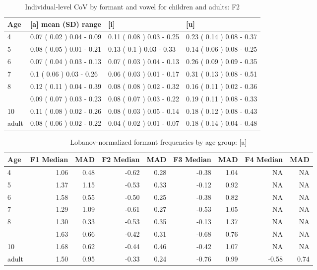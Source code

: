 \documentclass[
]{article}
\begin{document}
\begin{table}[!h]

\caption{\label{tab:delta-disp-tbl-spkr-alldata-f2}Individual-level CoV by formant and vowel for children and adults: F2}
\centering
\begin{tabular}[t]{llll}
\toprule
Age & [a] mean (SD) range & [i] & [u]\\
\midrule
4 & 0.07 ( 0.02 ) 0.04 - 0.09 & 0.11 ( 0.08 ) 0.03 - 0.25 & 0.23 ( 0.14 ) 0.08 - 0.37\\
5 & 0.08 ( 0.05 ) 0.01 - 0.21 & 0.13 ( 0.1 ) 0.03 - 0.33 & 0.14 ( 0.06 ) 0.08 - 0.25\\
6 & 0.07 ( 0.04 ) 0.03 - 0.13 & 0.07 ( 0.03 ) 0.04 - 0.13 & 0.26 ( 0.09 ) 0.09 - 0.35\\
7 & 0.1 ( 0.06 ) 0.03 - 0.26 & 0.06 ( 0.03 ) 0.01 - 0.17 & 0.31 ( 0.13 ) 0.08 - 0.51\\
8 & 0.12 ( 0.11 ) 0.04 - 0.39 & 0.08 ( 0.08 ) 0.02 - 0.32 & 0.16 ( 0.11 ) 0.02 - 0.36\\
\addlinespace
9 & 0.09 ( 0.07 ) 0.03 - 0.23 & 0.08 ( 0.07 ) 0.03 - 0.22 & 0.19 ( 0.11 ) 0.08 - 0.33\\
10 & 0.11 ( 0.08 ) 0.02 - 0.26 & 0.08 ( 0.03 ) 0.05 - 0.14 & 0.18 ( 0.12 ) 0.08 - 0.43\\
adult & 0.08 ( 0.06 ) 0.02 - 0.22 & 0.04 ( 0.02 ) 0.01 - 0.07 & 0.18 ( 0.14 ) 0.04 - 0.48\\
\bottomrule
\end{tabular}
\end{table}

\begin{table}[!h]

\caption{\label{tab:lobanov-meas-tbl-a}Lobanov-normalized formant frequencies by age group: [a]}
\centering
\begin{tabular}[t]{lrrrrrrrr}
\toprule
Age & F1 Median & MAD & F2 Median & MAD & F3 Median & MAD & F4 Median & MAD\\
\midrule
4 & 1.06 & 0.48 & -0.62 & 0.28 & -0.38 & 1.04 & NA & NA\\
5 & 1.37 & 1.15 & -0.53 & 0.33 & -0.12 & 0.92 & NA & NA\\
6 & 1.58 & 0.55 & -0.50 & 0.25 & -0.38 & 0.82 & NA & NA\\
7 & 1.29 & 1.09 & -0.61 & 0.27 & -0.53 & 1.05 & NA & NA\\
8 & 1.30 & 0.33 & -0.53 & 0.35 & -0.13 & 1.37 & NA & NA\\
\addlinespace
9 & 1.63 & 0.66 & -0.42 & 0.31 & -0.68 & 0.76 & NA & NA\\
10 & 1.68 & 0.62 & -0.44 & 0.46 & -0.42 & 1.07 & NA & NA\\
adult & 1.50 & 0.95 & -0.33 & 0.24 & -0.76 & 0.99 & -0.58 & 0.74\\
\bottomrule
\end{tabular}
\end{table}
\end{document}
